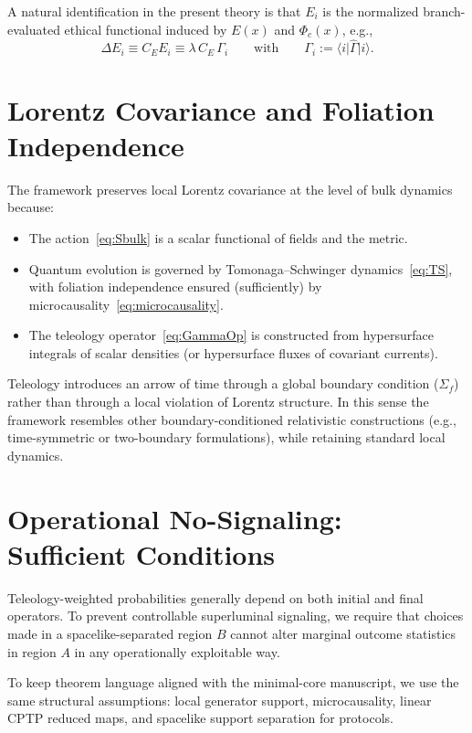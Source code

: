 \documentclass[reprint,amsmath,amssymb,aps,showkeys]{revtex4-2}
\newcommand{\bra}[1]{\langle #1\rvert}
\newcommand{\ket}[1]{\lvert #1\rangle}
\begin{document}
A natural identification in the present theory is that $E_i$ is the normalized branch-evaluated ethical functional induced by $E(x)$ and $\Phi_c(x)$, e.g.,
\begin{equation}
\Delta E_i \equiv C_E E_i \equiv \lambda\,C_E\,\Gamma_i
\qquad\text{with}\qquad
\Gamma_i := \bra{i}\hat{\Gamma}\ket{i}.
\end{equation}

\section{Lorentz Covariance and Foliation Independence}
The framework preserves local Lorentz covariance at the level of bulk dynamics because:
\begin{itemize}
\item The action~\eqref{eq:Sbulk} is a scalar functional of fields and the metric.
\item Quantum evolution is governed by Tomonaga--Schwinger dynamics~\eqref{eq:TS}, with foliation independence ensured (sufficiently) by microcausality~\eqref{eq:microcausality}.
\item The teleology operator~\eqref{eq:GammaOp} is constructed from hypersurface integrals of scalar densities (or hypersurface fluxes of covariant currents).
\end{itemize}

Teleology introduces an arrow of time through a global boundary condition ($\Sigma_f$) rather than through a local violation of Lorentz structure. In this sense the framework resembles other boundary-conditioned relativistic constructions (e.g., time-symmetric or two-boundary formulations), while retaining standard local dynamics.

\section{Operational No-Signaling: Sufficient Conditions}
Teleology-weighted probabilities generally depend on both initial and final operators. To prevent controllable superluminal signaling, we require that choices made in a spacelike-separated region $B$ cannot alter marginal outcome statistics in region $A$ in any operationally exploitable way.

To keep theorem language aligned with the minimal-core manuscript, we use the same structural assumptions: local generator support, microcausality, linear CPTP reduced maps, and spacelike support separation for protocols.
\end{document}
